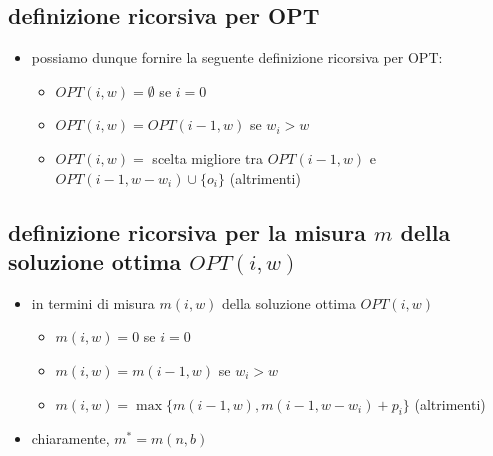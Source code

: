 \subsection*{definizione ricorsiva per OPT}
\begin{flushleft}
	\begin{itemize}
		\item possiamo dunque fornire la seguente definizione ricorsiva per OPT:
		\begin{itemize}
			\item $OPT(i,w)=\emptyset$ se $i=0$
			\item $OPT(i,w)=OPT(i-1,w)$ se $w_i>w$
			\item $OPT(i,w)=$ scelta migliore tra $OPT(i-1,w)$ e $OPT(i-1,w-w_i)\cup\{o_i\}$ (altrimenti)
		\end{itemize}
	\end{itemize}
\end{flushleft}


\subsection*{definizione ricorsiva per la misura $m$ della soluzione ottima $OPT(i,w)$}
\begin{flushleft}
	\begin{itemize}
		\item in termini di misura $m(i,w)$ della soluzione ottima $OPT(i,w)$
		\begin{itemize}
			\item $m(i,w)=0$ se $i=0$
			\item $m(i,w)=m(i-1,w)$ se $w_i>w$
			\item $m(i,w)=\max\{m(i-1,w),m(i-1,w-w_i)+p_i\}$ (altrimenti)
		\end{itemize}
		\item chiaramente, $m^*=m(n,b)$
	\end{itemize}
\end{flushleft}


